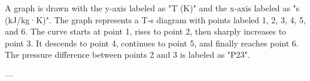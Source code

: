 A graph is drawn with the y-axis labeled as "T (K)" and the x-axis labeled as "s (kJ/kg·K)". The graph represents a T-s diagram with points labeled 1, 2, 3, 4, 5, and 6. The curve starts at point 1, rises to point 2, then sharply increases to point 3. It descends to point 4, continues to point 5, and finally reaches point 6. The pressure difference between points 2 and 3 is labeled as "P23".

---